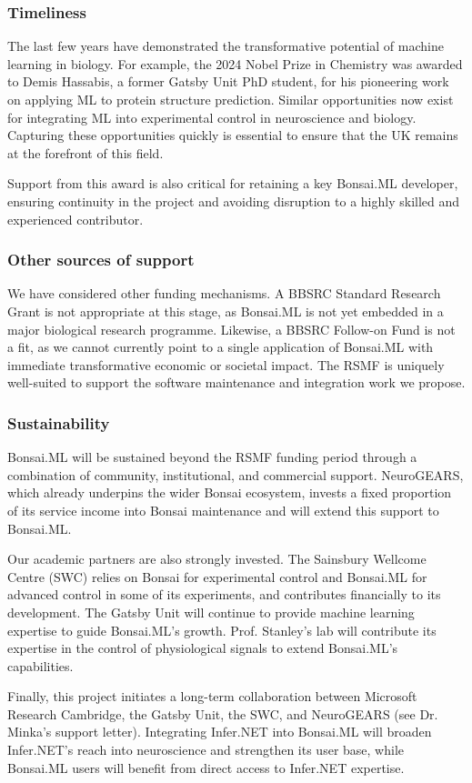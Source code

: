 \subsubsection*{Timeliness}

The last few years have demonstrated the transformative potential of machine
learning in biology. For example, the 2024 Nobel Prize in Chemistry was awarded
to Demis Hassabis, a former Gatsby Unit PhD student, for his pioneering work on
applying ML to protein structure prediction. Similar opportunities now exist
for integrating ML into experimental control in neuroscience and biology.
Capturing these opportunities quickly is essential to ensure that the UK
remains at the forefront of this field.

Support from this award is also critical for retaining a key Bonsai.ML
developer, ensuring continuity in the project and avoiding disruption to a
highly skilled and experienced contributor.

\subsubsection*{Other sources of support}

We have considered other funding mechanisms. A BBSRC Standard Research Grant is
not appropriate at this stage, as Bonsai.ML is not yet embedded in a major
biological research programme.
%
Likewise, a BBSRC Follow-on Fund is not a fit, as we cannot currently point to
a single application of Bonsai.ML with immediate transformative economic or
societal impact.
%
The RSMF is uniquely well-suited to support the software maintenance and
integration work we propose.

\subsubsection*{Sustainability}

Bonsai.ML will be sustained beyond the RSMF funding period through a
combination of community, institutional, and commercial support.
%
NeuroGEARS, which already underpins the wider Bonsai ecosystem, invests a fixed
proportion of its service income into Bonsai maintenance and will extend this
support to Bonsai.ML.

Our academic partners are also strongly invested.
%
The Sainsbury Wellcome Centre
(SWC) relies on Bonsai for experimental control and Bonsai.ML for advanced
control in some of its experiments, and contributes financially to its
development.
%
The Gatsby Unit will continue to provide machine learning
expertise to guide Bonsai.ML’s growth.
%
Prof. Stanley’s lab will contribute its expertise in the control of
physiological signals to extend Bonsai.ML’s capabilities.

Finally, this project initiates a long-term collaboration between Microsoft
Research Cambridge, the Gatsby Unit, the SWC, and NeuroGEARS (see Dr. Minka’s
support letter). Integrating Infer.NET into Bonsai.ML will broaden Infer.NET’s
reach into neuroscience and strengthen its user base, while Bonsai.ML users
will benefit from direct access to Infer.NET expertise.
